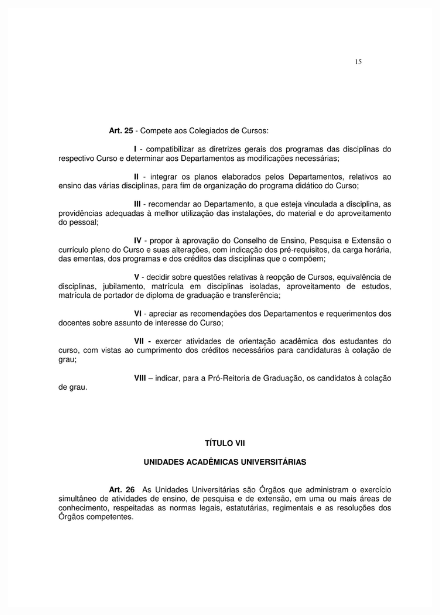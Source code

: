 \begin{figure}[p]
	\centering 
	\includegraphics[scale=0.7]{capitulos/resolucoes/cuni414/cuni414-15.pdf}
\end{figure}

